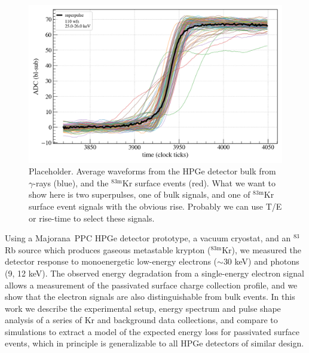 \documentclass[nofootinbib,superscriptaddress, aps, prc, 
10pt, amsmath, amssymb, bibnotes,
altaffilletter, twocolumn, floatfix]{revtex4-2}
\def\MJ{{\sc Majorana}}
\def\MJD{{\sc Majorana Demonstrator}}
\def\enrge{${}^{\mathrm{enr}}$Ge}
\def\kr83{{${}^{83\mathrm{m}}$Kr}}
\begin{document}
    \begin{figure}
        \includegraphics[width=\columnwidth]{krstc_waveforms.png}
        \caption{Placeholder. Average waveforms from the HPGe detector bulk from $\gamma$-rays (blue), and the \kr83 surface events (red).  What we want to show here is two superpulses, one of bulk signals, and one of \kr83 surface event signals with the obvious rise.  Probably we can use T/E or rise-time to select these signals.}
        \label{fig:waveforms}
    \end{figure}

    Using a \MJ\ PPC HPGe detector prototype, a vacuum cryostat, and an $^{83}$Rb source which produces gaseous metastable krypton (\kr83), we measured the detector response to monoenergetic low-energy electrons ($\sim30$ keV) and photons (9, 12 keV).
    The observed energy degradation from a single-energy electron signal allows a measurement of the passivated surface charge collection profile, and we show that the electron signals are also distinguishable from bulk events.
    In this work we describe the experimental setup, energy spectrum and pulse shape analysis of a series of Kr and background data collections, and compare to simulations to extract a model of the expected energy loss for passivated surface events, which in principle is generalizable to all HPGe detectors of similar design.

\end{document}
